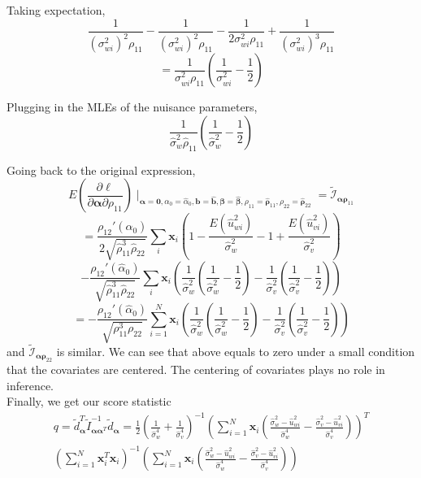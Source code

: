 \documentclass[aap,authoryear, preprint]{imsart}
\numberwithin{equation}{section}
\theoremstyle{plain}
\begin{document}
\noindent Taking expectation,
$$\frac{1}{(\sigma_{wi}^2)^2\rho_{11}} - \frac{1}{(\sigma_{wi}^2)^2\rho_{11}} - 
\frac{1}{2\sigma_{wi}^2 \rho_{11}} + \frac{1}{(\sigma_{wi}^2)^3\rho_{11}}$$
$$= \frac{1}{\sigma_{wi}^2\rho_{11}} \left( \frac{1}{\sigma_{wi}^2} - \frac{1}{2}\right)$$

\noindent Plugging in the MLEs of the nuisance parameters,
$$\frac{1}{\hat{\sigma}_w^2\hat{\rho}_{11}}\left(\frac{1}{\hat{\sigma}_{w}^2} - \frac{1}{2}  \right)$$

Going back to the original expression,
$$E\left(\frac{\partial \ell}{\partial \bm{\alpha} \partial \rho_{11}}\right)\mid_{
        \bm{\alpha}=\bm{0}, 
        \alpha_0 = \hat{\alpha}_0,
        \bm{b} = \bm{\hat{b}},
        \bm{\beta} = \bm{\hat{\beta}},
        {\rho}_{11} = \bm{\hat{\rho}}_{11},
        {\rho}_{22} = \bm{\hat{\rho}}_{22}} =\tilde{\mathcal{I}}_{\bm{\alpha}\bm{\rho}_{11}}$$
$$= \frac{\rho_{12}'(\hat{\alpha}_0)}{2\sqrt{\hat{\rho}_{11}^3\hat{\rho}_{22}}} \sum_i \bm{x}_i \left( 1 - \frac{E(\hat{u}_{wi}^2)}{\hat{\sigma}_{w}^2} - 1 + \frac{E(\hat{u}_{vi}^2)}{\hat{\sigma}_{v}^2} \right)
$$
$$- \frac{\rho_{12}'(\hat{\alpha}_0)}{\sqrt{\hat{\rho}_{11}^3\hat{\rho}_{22}}}
\sum_i \bm{x}_i \left( \frac{1}{\hat{\sigma}_w^2}\left( \frac{1}{\hat{\sigma}_w^2} - \frac{1}{2} \right) - \frac{1}{\hat{\sigma}_v^2} \left( \frac{1}{\hat{\sigma}_v^2} - \frac{1}{2} \right) \right)
$$
$$=-\frac{\rho_{12}'(\hat{\alpha}_0)}{\sqrt{\rho_{11}^3 \rho_{22}}} \sum_{i=1}^{N} \bm{x}_i \left( \frac{1}{\hat{\sigma}_w^2}\left( \frac{1}{\hat{\sigma}_w^2} - \frac{1}{2} \right) - \frac{1}{\hat{\sigma}_v^2} \left( \frac{1}{\hat{\sigma}_v^2} - \frac{1}{2} \right) \right)$$
and $\tilde{\mathcal{I}}_{\bm{\alpha}\bm{\rho}_{22}}$ is similar. We can see that above equals to zero under a small condition that the covariates are centered. The centering of covariates plays no role in inference. \\

Finally, we get our score statistic
\begin{equation}
    \begin{multlined}
    q = \tilde{d}_{\bm{\alpha}}^T \tilde{I}_{\bm{\alpha}\bm{\alpha}^T}^{-1}
    \tilde{d}_{\bm{\alpha}}
    =\frac{1}{2}\left( \frac{1}{\hat{\sigma}_w^4}+\frac{1}{\hat{\sigma}_v^4}\right)^{-1}
\left(\sum_{i=1}^{N} \bm{x}_{i} 
\left(
\frac{\hat{\sigma}_w^2-\hat{u}_{wi}^2}{\hat{\sigma}_w^4}- \frac{\hat{\sigma}_v^2-\hat{u}_{vi}^2}{\hat{\sigma}_v^4}
\right)
\right)^T \\
\left( \sum_{i=1}^{N} \bm{x}_i^T \bm{x}_i \right)^{-1}
\left(
\sum_{i=1}^{N} \bm{x}_{i} 
\left(
\frac{\hat{\sigma}_w^2-\hat{u}_{wi}^2}{\hat{\sigma}_w^4}- \frac{\hat{\sigma}_v^2-\hat{u}_{vi}^2}{\hat{\sigma}_v^4}
\right)
\right)
    \end{multlined}
\end{equation}
\end{document}
